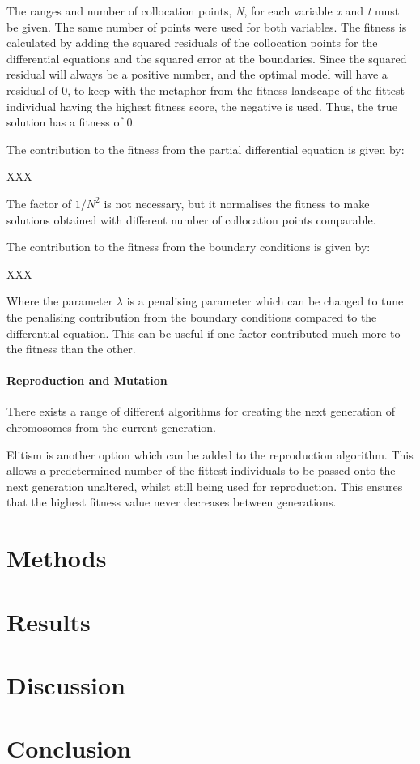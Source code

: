 \documentclass[multicolumn, 12pt]{extarticle}
\begin{document}
The ranges and number of collocation points, \textit{N}, for each variable \textit{x} and \textit{t} must be given. The same number of points were used for both variables. The fitness is calculated by adding the squared residuals of the collocation points for the differential equations and the squared error at the boundaries. Since the squared residual will always be a positive number, and the optimal model will have a residual of 0, to keep with the metaphor from the fitness landscape of the fittest individual having the highest fitness score, the negative is used. Thus, the true solution has a fitness of 0. 

The contribution to the fitness from the partial differential equation is given by: 

XXX

The factor of $1/N^{2}$ is not necessary, but it normalises the fitness to make solutions obtained with different number of collocation points comparable. 

The contribution to the fitness from the boundary conditions is given by: 

XXX

Where the parameter $\lambda$ is a penalising parameter which can be changed to tune the penalising contribution from the boundary conditions compared to the differential equation. This can be useful if one factor contributed much more to the fitness than the other. 

\paragraph{Reproduction and Mutation}
There exists a range of different algorithms for creating the next generation of chromosomes from the current generation. 

Elitism is another option which can be added to the reproduction algorithm. This allows a predetermined number of the fittest individuals to be passed onto the next generation unaltered, whilst still being used for reproduction. This ensures that the highest fitness value never decreases between generations. 











\section{Methods}

\section{Results}

\section{Discussion}

\section{Conclusion}
\end{document}
